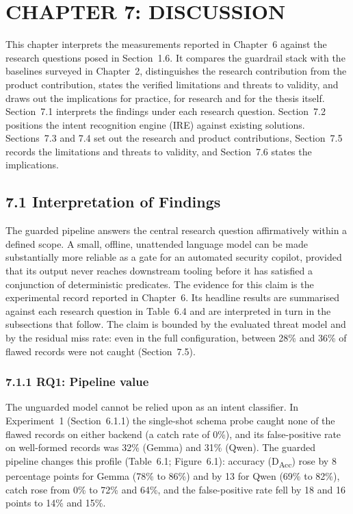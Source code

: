 \documentclass[
]{article}
\begin{document}
\hypertarget{chapter-7-discussion}{%
\section{CHAPTER 7: DISCUSSION}\label{chapter-7-discussion}}

This chapter interprets the measurements reported in Chapter~6 against
the research questions posed in Section~1.6. It compares the guardrail
stack with the baselines surveyed in Chapter~2, distinguishes the
research contribution from the product contribution, states the verified
limitations and threats to validity, and draws out the implications for
practice, for research and for the thesis itself. Section~7.1 interprets
the findings under each research question. Section~7.2 positions the
intent recognition engine (IRE) against existing solutions. Sections~7.3
and 7.4 set out the research and product contributions, Section~7.5
records the limitations and threats to validity, and Section~7.6 states
the implications.

\hypertarget{interpretation-of-findings}{%
\subsection{7.1 Interpretation of
Findings}\label{interpretation-of-findings}}

The guarded pipeline answers the central research question affirmatively
within a defined scope. A small, offline, unattended language model can
be made substantially more reliable as a gate for an automated security
copilot, provided that its output never reaches downstream tooling
before it has satisfied a conjunction of deterministic predicates. The
evidence for this claim is the experimental record reported in
Chapter~6. Its headline results are summarised against each research
question in Table~6.4 and are interpreted in turn in the subsections
that follow. The claim is bounded by the evaluated threat model and by
the residual miss rate: even in the full configuration, between 28\% and
36\% of flawed records were not caught (Section~7.5).

\hypertarget{rq1-pipeline-value}{%
\subsubsection{7.1.1 RQ1: Pipeline value}\label{rq1-pipeline-value}}

The unguarded model cannot be relied upon as an intent classifier. In
Experiment~1 (Section~6.1.1) the single-shot schema probe caught none of
the flawed records on either backend (a catch rate of 0\%), and its
false-positive rate on well-formed records was 32\% (Gemma) and 31\%
(Qwen). The guarded pipeline changes this profile (Table~6.1;
Figure~6.1): accuracy (D\textsubscript{Acc}) rose by 8 percentage points
for Gemma (78\% to 86\%) and by 13 for Qwen (69\% to 82\%), catch rose
from 0\% to 72\% and 64\%, and the false-positive rate fell by 18 and 16
points to 14\% and 15\%.
\end{document}
